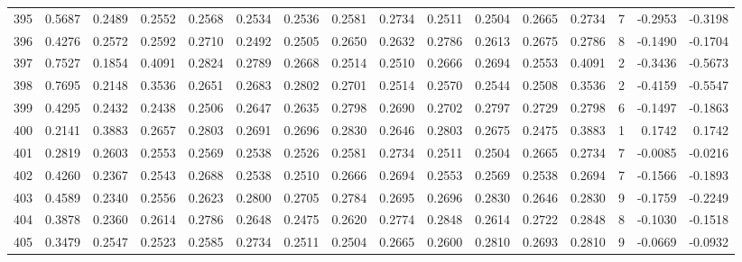 \begin{tabular}{lrrrrrrrrrrrrrrr}
395 &      0.5687 &  0.2489 &  0.2552 &  0.2568 &  0.2534 &  0.2536 &  0.2581 &  0.2734 &  0.2511 &  0.2504 &   0.2665 &     0.2734 &      7 &                   -0.2953 &                    -0.3198 \\
396 &      0.4276 &  0.2572 &  0.2592 &  0.2710 &  0.2492 &  0.2505 &  0.2650 &  0.2632 &  0.2786 &  0.2613 &   0.2675 &     0.2786 &      8 &                   -0.1490 &                    -0.1704 \\
397 &      0.7527 &  0.1854 &  0.4091 &  0.2824 &  0.2789 &  0.2668 &  0.2514 &  0.2510 &  0.2666 &  0.2694 &   0.2553 &     0.4091 &      2 &                   -0.3436 &                    -0.5673 \\
398 &      0.7695 &  0.2148 &  0.3536 &  0.2651 &  0.2683 &  0.2802 &  0.2701 &  0.2514 &  0.2570 &  0.2544 &   0.2508 &     0.3536 &      2 &                   -0.4159 &                    -0.5547 \\
399 &      0.4295 &  0.2432 &  0.2438 &  0.2506 &  0.2647 &  0.2635 &  0.2798 &  0.2690 &  0.2702 &  0.2797 &   0.2729 &     0.2798 &      6 &                   -0.1497 &                    -0.1863 \\
400 &      0.2141 &  0.3883 &  0.2657 &  0.2803 &  0.2691 &  0.2696 &  0.2830 &  0.2646 &  0.2803 &  0.2675 &   0.2475 &     0.3883 &      1 &                    0.1742 &                     0.1742 \\
401 &      0.2819 &  0.2603 &  0.2553 &  0.2569 &  0.2538 &  0.2526 &  0.2581 &  0.2734 &  0.2511 &  0.2504 &   0.2665 &     0.2734 &      7 &                   -0.0085 &                    -0.0216 \\
402 &      0.4260 &  0.2367 &  0.2543 &  0.2688 &  0.2538 &  0.2510 &  0.2666 &  0.2694 &  0.2553 &  0.2569 &   0.2538 &     0.2694 &      7 &                   -0.1566 &                    -0.1893 \\
403 &      0.4589 &  0.2340 &  0.2556 &  0.2623 &  0.2800 &  0.2705 &  0.2784 &  0.2695 &  0.2696 &  0.2830 &   0.2646 &     0.2830 &      9 &                   -0.1759 &                    -0.2249 \\
404 &      0.3878 &  0.2360 &  0.2614 &  0.2786 &  0.2648 &  0.2475 &  0.2620 &  0.2774 &  0.2848 &  0.2614 &   0.2722 &     0.2848 &      8 &                   -0.1030 &                    -0.1518 \\
405 &      0.3479 &  0.2547 &  0.2523 &  0.2585 &  0.2734 &  0.2511 &  0.2504 &  0.2665 &  0.2600 &  0.2810 &   0.2693 &     0.2810 &      9 &                   -0.0669 &                    -0.0932 \\

\end{tabular}
